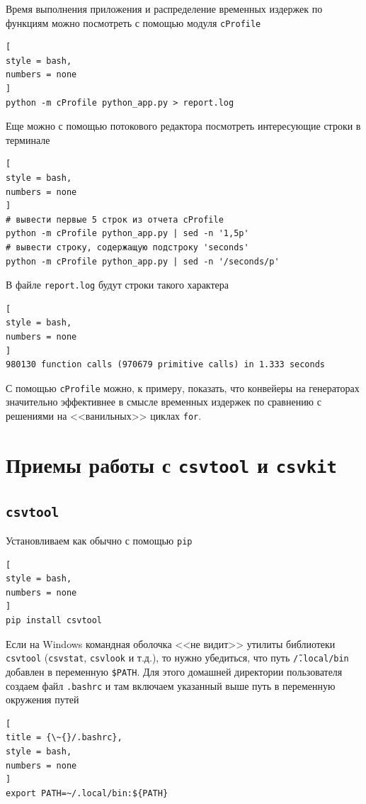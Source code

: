 \documentclass[%
	11pt,
	a4paper,
	utf8,
		]{article}
\begin{document}
Время выполнения приложения и распределение временных издержек по функциям можно посмотреть с помощью модуля \texttt{cProfile}
\begin{lstlisting}[
style = bash,
numbers = none	
]
python -m cProfile python_app.py > report.log
\end{lstlisting}

Еще можно с помощью потокового редактора посмотреть интересующие строки в терминале
\begin{lstlisting}[
style = bash,
numbers = none	
]
# вывести первые 5 строк из отчета cProfile
python -m cProfile python_app.py | sed -n '1,5p'
# вывести строку, содержащую подстроку 'seconds'
python -m cProfile python_app.py | sed -n '/seconds/p'
\end{lstlisting}

В файле \texttt{report.log} будут строки такого характера
\begin{lstlisting}[
style = bash,
numbers = none	
]
980130 function calls (970679 primitive calls) in 1.333 seconds
\end{lstlisting}

С помощью \texttt{cProfile} можно, к примеру, показать, что конвейеры на генераторах значительно эффективнее в смысле временных издержек по сравнению с решениями на <<ванильных>> циклах \texttt{for}.


\section{Приемы работы с \texttt{csvtool} и \texttt{csvkit}}

\subsection{\texttt{csvtool}}

Установливаем как обычно с помощью \texttt{pip}
\begin{lstlisting}[
style = bash,
numbers = none	
]
pip install csvtool
\end{lstlisting}

Если на Windows командная оболочка <<не видит>> утилиты библиотеки \texttt{csvtool} (\texttt{csvstat}, \texttt{csvlook} и т.д.), то нужно убедиться, что путь \texttt{\~/.local/bin} добавлен в переменную \texttt{\$PATH}. Для этого домашней директории пользователя создаем файл \texttt{.bashrc} и там включаем указанный выше путь в переменную окружения путей
\begin{lstlisting}[
title = {\~{}/.bashrc},
style = bash,
numbers = none	
]
export PATH=~/.local/bin:${PATH}
\end{lstlisting}
\end{document}
